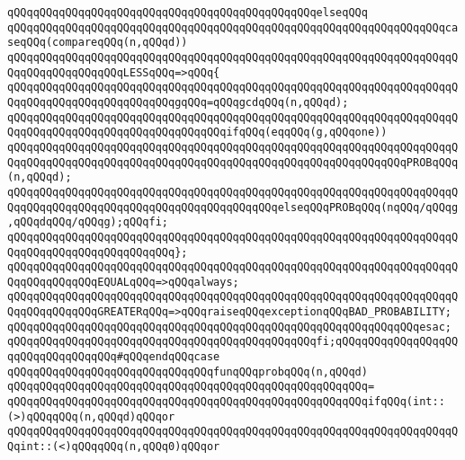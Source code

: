 \verb|qQQqqQQqqQQqqQQqqQQqqQQqqQQqqQQqqQQqqQQqqQQqqQQqelseqQQq|\newline
\verb|qQQqqQQqqQQqqQQqqQQqqQQqqQQqqQQqqQQqqQQqqQQqqQQqqQQqqQQqqQQqqQQqqQQqcaseqQQq(compareqQQq(n,qQQqd))|\newline
\newline
\verb|qQQqqQQqqQQqqQQqqQQqqQQqqQQqqQQqqQQqqQQqqQQqqQQqqQQqqQQqqQQqqQQqqQQqqQQqqQQqqQQqqQQqqQQqLESSqQQq=>qQQq{|\newline
\verb|qQQqqQQqqQQqqQQqqQQqqQQqqQQqqQQqqQQqqQQqqQQqqQQqqQQqqQQqqQQqqQQqqQQqqQQqqQQqqQQqqQQqqQQqqQQqqQQqgqQQq=qQQqgcdqQQq(n,qQQqd);|\newline
\newline
\verb|qQQqqQQqqQQqqQQqqQQqqQQqqQQqqQQqqQQqqQQqqQQqqQQqqQQqqQQqqQQqqQQqqQQqqQQqqQQqqQQqqQQqqQQqqQQqqQQqqQQqqQQqifqQQq(eqqQQq(g,qQQqone))|\newline
\verb|qQQqqQQqqQQqqQQqqQQqqQQqqQQqqQQqqQQqqQQqqQQqqQQqqQQqqQQqqQQqqQQqqQQqqQQqqQQqqQQqqQQqqQQqqQQqqQQqqQQqqQQqqQQqqQQqqQQqqQQqqQQqqQQqqQQqPROBqQQq(n,qQQqd);|\newline
\verb|qQQqqQQqqQQqqQQqqQQqqQQqqQQqqQQqqQQqqQQqqQQqqQQqqQQqqQQqqQQqqQQqqQQqqQQqqQQqqQQqqQQqqQQqqQQqqQQqqQQqqQQqqQQqqQQqelseqQQqPROBqQQq(nqQQq/qQQqg,qQQqdqQQq/qQQqg);qQQqfi;|\newline
\verb|qQQqqQQqqQQqqQQqqQQqqQQqqQQqqQQqqQQqqQQqqQQqqQQqqQQqqQQqqQQqqQQqqQQqqQQqqQQqqQQqqQQqqQQqqQQqqQQq};|\newline
\newline
\verb|qQQqqQQqqQQqqQQqqQQqqQQqqQQqqQQqqQQqqQQqqQQqqQQqqQQqqQQqqQQqqQQqqQQqqQQqqQQqqQQqqQQqEQUALqQQq=>qQQqalways;|\newline
\verb|qQQqqQQqqQQqqQQqqQQqqQQqqQQqqQQqqQQqqQQqqQQqqQQqqQQqqQQqqQQqqQQqqQQqqQQqqQQqqQQqqQQqGREATERqQQq=>qQQqraiseqQQqexceptionqQQqBAD_PROBABILITY;|\newline
\verb|qQQqqQQqqQQqqQQqqQQqqQQqqQQqqQQqqQQqqQQqqQQqqQQqqQQqqQQqqQQqqQQqesac;|\newline
\verb|qQQqqQQqqQQqqQQqqQQqqQQqqQQqqQQqqQQqqQQqqQQqqQQqfi;qQQqqQQqqQQqqQQqqQQqqQQqqQQqqQQqqQQq#qQQqendqQQqcase|\newline
\newline
\verb|qQQqqQQqqQQqqQQqqQQqqQQqqQQqqQQqfunqQQqprobqQQq(n,qQQqd)|\newline
\verb|qQQqqQQqqQQqqQQqqQQqqQQqqQQqqQQqqQQqqQQqqQQqqQQqqQQqqQQq=|\newline
\verb|qQQqqQQqqQQqqQQqqQQqqQQqqQQqqQQqqQQqqQQqqQQqqQQqqQQqqQQqifqQQq(int::(>)qQQqqQQq(n,qQQqd)qQQqor|\newline
\verb|qQQqqQQqqQQqqQQqqQQqqQQqqQQqqQQqqQQqqQQqqQQqqQQqqQQqqQQqqQQqqQQqqQQqqQQqint::(<)qQQqqQQq(n,qQQq0)qQQqor|\newline
